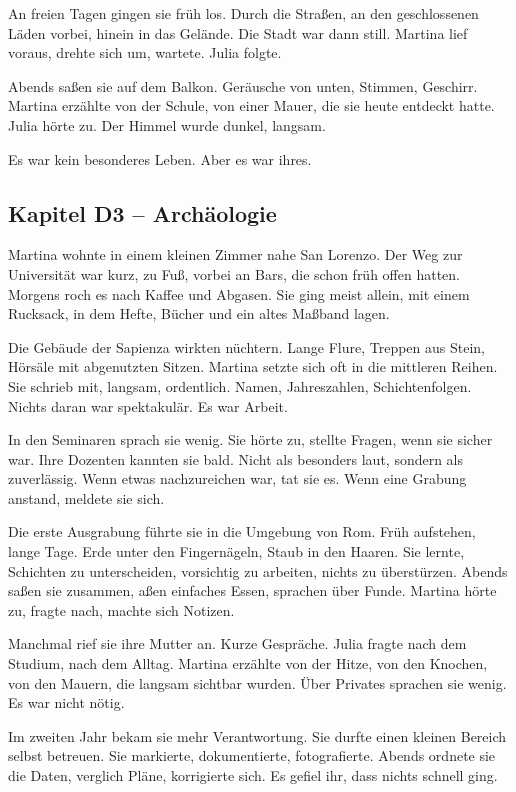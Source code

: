\documentclass[
]{article}
\begin{document}
An freien Tagen gingen sie früh los. Durch die Straßen, an den geschlossenen Läden vorbei, hinein in das Gelände. Die Stadt war dann still. Martina lief voraus, drehte sich um, wartete. Julia folgte.

Abends saßen sie auf dem Balkon. Geräusche von unten, Stimmen, Geschirr. Martina erzählte von der Schule, von einer Mauer, die sie heute entdeckt hatte. Julia hörte zu. Der Himmel wurde dunkel, langsam.

Es war kein besonderes Leben. Aber es war ihres.

\subsection{Kapitel D3 -- Archäologie}\label{kapitel-d3-archuxe4ologie}

Martina wohnte in einem kleinen Zimmer nahe San Lorenzo. Der Weg zur Universität war kurz, zu Fuß, vorbei an Bars, die schon früh offen hatten. Morgens roch es nach Kaffee und Abgasen. Sie ging meist allein, mit einem Rucksack, in dem Hefte, Bücher und ein altes Maßband lagen.

Die Gebäude der Sapienza wirkten nüchtern. Lange Flure, Treppen aus Stein, Hörsäle mit abgenutzten Sitzen. Martina setzte sich oft in die mittleren Reihen. Sie schrieb mit, langsam, ordentlich. Namen, Jahreszahlen, Schichtenfolgen. Nichts daran war spektakulär. Es war Arbeit.

In den Seminaren sprach sie wenig. Sie hörte zu, stellte Fragen, wenn sie sicher war. Ihre Dozenten kannten sie bald. Nicht als besonders laut, sondern als zuverlässig. Wenn etwas nachzureichen war, tat sie es. Wenn eine Grabung anstand, meldete sie sich.

Die erste Ausgrabung führte sie in die Umgebung von Rom. Früh aufstehen, lange Tage. Erde unter den Fingernägeln, Staub in den Haaren. Sie lernte, Schichten zu unterscheiden, vorsichtig zu arbeiten, nichts zu überstürzen. Abends saßen sie zusammen, aßen einfaches Essen, sprachen über Funde. Martina hörte zu, fragte nach, machte sich Notizen.

Manchmal rief sie ihre Mutter an. Kurze Gespräche. Julia fragte nach dem Studium, nach dem Alltag. Martina erzählte von der Hitze, von den Knochen, von den Mauern, die langsam sichtbar wurden. Über Privates sprachen sie wenig. Es war nicht nötig.

Im zweiten Jahr bekam sie mehr Verantwortung. Sie durfte einen kleinen Bereich selbst betreuen. Sie markierte, dokumentierte, fotografierte. Abends ordnete sie die Daten, verglich Pläne, korrigierte sich. Es gefiel ihr, dass nichts schnell ging.
\end{document}

